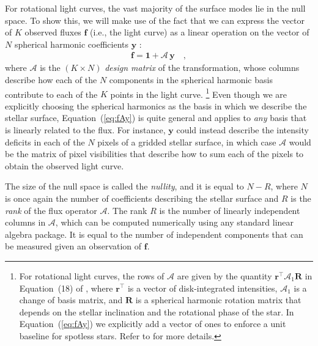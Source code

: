 \documentclass[modern]{aastex62}
\begin{document}
For rotational light curves,
the vast majority of the surface modes lie in the null
space. To show this, we will make use of the fact that we can express
the vector of $K$ observed fluxes $\mathbf{f}$ (i.e., the light curve)
as a linear operation on the vector of $N$
spherical harmonic coefficients $\mathbf{y}$ \citep{Luger2019}:
%
\begin{align}
    \label{eq:fAy}
    \mathbf{f} = \mathbf{1} + \pmb{\mathcal{A}} \, \mathbf{y}
    \quad,
\end{align}
%
where $\pmb{\mathcal{A}}$ is the $(K \times N)$ \emph{design matrix} of the transformation, whose columns
describe how each of the $N$ components in the spherical harmonic basis contribute
to each of the $K$ points in the light curve.%
\footnote{%
    For rotational light curves, the rows of $\pmb{\mathcal{A}}$ are given by the
    quantity $\mathbf{r}^\top \pmb{\mathcal{A}}_1 \mathbf{R}$ in Equation~(18) of
    \citet{Luger2019}, where $\mathbf{r}^\top$ is a vector of disk-integrated
    intensities, $\pmb{\mathcal{A}}_1$ is a change of basis matrix, and $\mathbf{R}$
    is a spherical harmonic rotation matrix that depends on the stellar inclination
    and the rotational phase of the star. In Equation~(\ref{eq:fAy}) we explicitly
    add a vector of ones to enforce a unit baseline for spotless stars.
    Refer to \citet{Luger2019} for more details.
}
%
Even though we are explicitly choosing the spherical harmonics as the basis in which
we describe the stellar surface, Equation~(\ref{eq:fAy}) is quite general and applies to
\emph{any} basis that is linearly related to the flux. For instance, $\mathbf{y}$
could instead describe the intensity deficits in each of the $N$ pixels of a gridded stellar
surface, in which case $\pmb{\mathcal{A}}$ would be the matrix of pixel visibilities that describe
how to sum each of the pixels to obtain the observed light curve.

The size of the null space is called the \emph{nullity}, and it is equal to
$N - R$, where $N$ is once again the number of coefficients describing the
stellar surface and $R$ is the \emph{rank} of the flux operator $\pmb{\mathcal{A}}$.
The rank $R$ is the number of linearly independent columns in $\pmb{\mathcal{A}}$, which
can be computed numerically using any standard linear algebra package. It is equal
to the number of independent components that can be measured given
an observation of $\mathbf{f}$.
\end{document}
